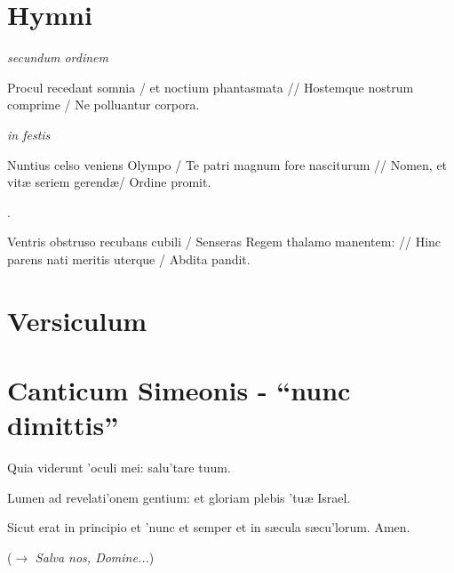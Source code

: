 \documentclass[initial=ZallmanCaps,staff=19,font=greciliae,11pt,a4paper,openany,twoside,choralsign=PfefferMediaeval]{gregorian}
\begin{document}
\section*{Hymni}
\textit{secundum ordinem}\par
{}\par
\begin{multicols}{2}\setlength{\columnseprule}{0.2px}
Procul recedant somnia / et noctium phantasmata // Hostemque nostrum comprime / Ne polluantur corpora.\par
{}\par
\end{multicols}
\textit{in festis}\par
{}
\par
\vskip9bp
\begin{multicols}{2}\setlength{\columnseprule}{0.2px}
Nuntius celso veniens Olympo / Te patri magnum fore nasciturum // Nomen, et vitæ seriem gerend\ae / Ordine promit.\par
{}.\par\vfill\columnbreak
Ventris obstruso recubans cubili / Senseras Regem thalamo manentem: // Hinc parens nati meritis uterque / Abdita pandit.\par
{}\par
\end{multicols}\par\vskip9mm
\section*{Versiculum}
\newpage
\section*{Canticum Simeonis - \enquote{nunc dimittis}}
\par
\begin{multicols}{2}\setlength{\columnseprule}{0.2px}
Quia viderunt 'oculi mei: \grestar{} salu'tare tuum.\par
{}\par
Lumen ad revelati'onem gentium: \grestar{} et gloriam plebis 'tuæ Israel.\par
{}\par
Sicut erat in principio et 'nunc et semper \grestar{} et in sæcula sæcu'lorum. Amen.\par\vfill
($\rightarrow$ \textit{Salva nos, Domine...})
\end{multicols}
\end{document}
